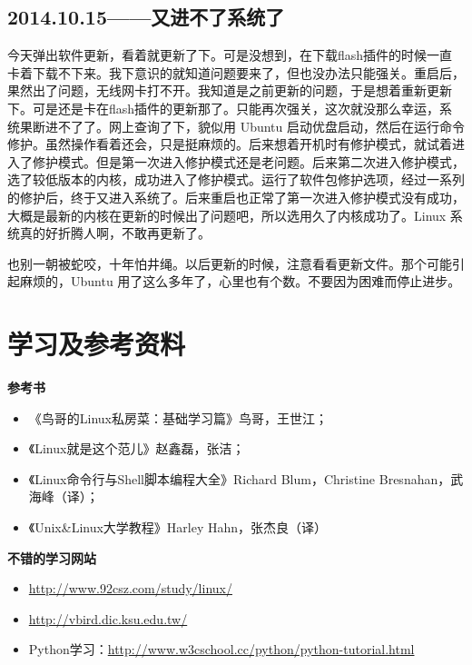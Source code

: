\documentclass[a4paper,11pt,twoside]{book}
\newcommand{\sanhao}{\fontsize{15.75pt}{\baselineskip}\selectfont}
\begin{document}
\subsection*{2014.10.15——又进不了系统了}
今天弹出软件更新，看着就更新了下。可是没想到，在下载flash插件的时候一直卡着下载不下来。我下意识的就知道问题要来了，但也没办法只能强关。重启后，果然出了问题，无线网卡打不开。我知道是之前更新的问题，于是想着重新更新下。可是还是卡在flash插件的更新那了。只能再次强关，这次就没那么幸运，系统果断进不了了。网上查询了下，貌似用 Ubuntu  启动优盘启动，然后在运行命令修护。虽然操作看着还会，只是挺麻烦的。后来想着开机时有修护模式，就试着进入了修护模式。但是第一次进入修护模式还是老问题。后来第二次进入修护模式，选了较低版本的内核，成功进入了修护模式。运行了软件包修护选项，经过一系列的修护后，终于又进入系统了。后来重启也正常了第一次进入修护模式没有成功，大概是最新的内核在更新的时候出了问题吧，所以选用久了内核成功了。Linux 系统真的好折腾人啊，不敢再更新了。

也别一朝被蛇咬，十年怕井绳。以后更新的时候，注意看看更新文件。那个可能引起麻烦的，Ubuntu 用了这么多年了，心里也有个数。不要因为困难而停止进步。



\section*{学习及参考资料}
\textbf{参考书}
\begin{itemize}
\item 《鸟哥的Linux私房菜：基础学习篇》鸟哥，王世江；
\item 《Linux就是这个范儿》赵鑫磊，张洁；
\item 《Linux命令行与Shell脚本编程大全》Richard Blum，Christine Bresnahan，武海峰（译）；
\item 《Unix\&Linux大学教程》Harley Hahn，张杰良（译）
\end{itemize}

\textbf{不错的学习网站}
\begin{itemize}
\item \url{http://www.92csz.com/study/linux/}

\item \url{http://vbird.dic.ksu.edu.tw/}

\item Python学习：\url{http://www.w3cschool.cc/python/python-tutorial.html}
\end{itemize}
\end{document}
